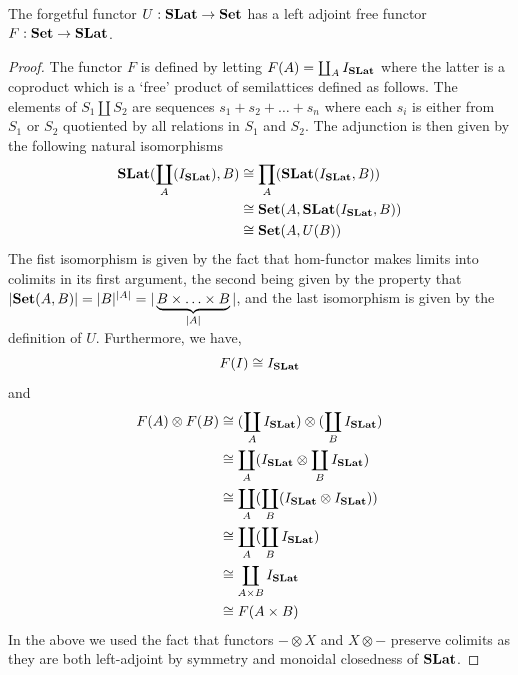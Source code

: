 \begin{prop}
	The forgetful functor $U : \mathbf{SLat} \to \mathbf{Set}$ has a left adjoint free functor $F : \mathbf{Set} \to \mathbf{SLat}$.
\end{prop}
\begin{proof}
	The functor $F$ is defined by letting $F(A) = \coprod_{A} I_{\mathbf{SLat}}$ where the latter is a coproduct which is a `free' product of semilattices defined as follows.
	The elements of $S_{1} \coprod S_{2}$ are sequences $s_{1} + s_{2} + \ldots + s_{n}$ where each $s_{i}$ is either from $S_{1}$ or $S_{2}$ quotiented by all relations in $S_{1}$ and $S_{2}$.
	The adjunction is then given by the following natural isomorphisms
	\begin{align*}
		\mathbf{SLat}(\coprod_{A}(I_{\mathbf{SLat}}), B) & \cong \prod_{A}(\mathbf{SLat}(I_{\mathbf{SLat}}, B))       \\
		                                                   & \cong \mathbf{Set}(A,\mathbf{SLat}(I_{\mathbf{SLat}}, B)) \\
		                                                   & \cong \mathbf{Set}(A, U(B))
	\end{align*}
	The fist isomorphism is given by the fact that hom-functor makes limits into colimits in its first argument, the second being given by the property that $|\mathbf{Set}(A,B)| = |B|^{|A|} = |\underbrace{B \times \ldots \times B}_{|A|}|$, and the last isomorphism is given by the definition of $U$.
	Furthermore, we have,
	\[
		F(I) \cong I_{\mathbf{SLat}}
	\]
	and
	\begin{align*}
		F(A) \otimes F(B) & \cong (\coprod_{A} I_{\mathbf{SLat}}) \otimes (\coprod_{B} I_{\mathbf{SLat}}) \\
		                  & \cong \coprod_{A} (I_{\mathbf{SLat}} \otimes \coprod_{B} I_{\mathbf{SLat}})   \\
		                  & \cong \coprod_{A} (\coprod_{B} (I_{\mathbf{SLat}} \otimes I_{\mathbf{SLat}})) \\
		                  & \cong \coprod_{A} (\coprod_{B} I_{\mathbf{SLat}})                              \\
		                  & \cong \coprod_{A \times B} I_{\mathbf{SLat}}                                   \\
		                  & \cong F(A \times B)
	\end{align*}
	In the above we used the fact that functors $- \otimes X$ and $X \otimes -$ preserve colimits as they are both left-adjoint by symmetry and monoidal closedness of $\mathbf{SLat}$.
\end{proof}

